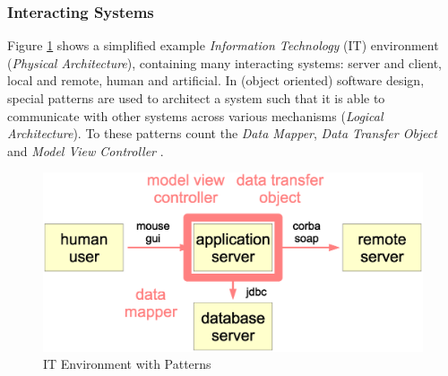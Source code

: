 %
%
%
%
%
%
%

\subsubsection{Interacting Systems}
\label{interacting_systems_heading}

Figure \ref{communication_figure} shows a simplified example
\emph{Information Technology} (IT) environment (\emph{Physical Architecture}),
containing many interacting systems: server and client, local and remote, human
and artificial. In (object oriented) software design, special patterns are used
to architect a system such that it is able to communicate with other systems
across various mechanisms (\emph{Logical Architecture}). To these patterns
count the \emph{Data Mapper}, \emph{Data Transfer Object} and
\emph{Model View Controller} \cite{fowler2002}.

\begin{figure}[ht]
    \begin{center}
        \includegraphics[scale=0.2]{vector/communication.eps}
        \caption{IT Environment with Patterns}
        \label{communication_figure}
    \end{center}
\end{figure}

